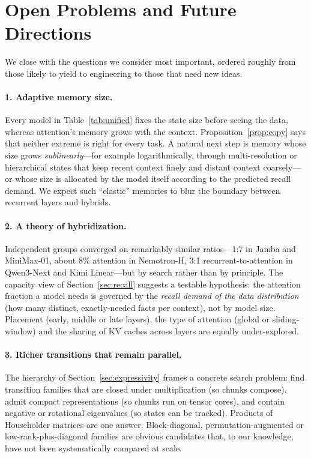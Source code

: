 \documentclass[a4paper]{article}
\theoremstyle{plain}
\theoremstyle{remark}
\begin{document}
\section{Open Problems and Future Directions}
\label{sec:future}
We close with the questions we consider most important, ordered roughly from those likely to yield to engineering to those that need new ideas.

\paragraph{1. Adaptive memory size.} Every model in Table~\ref{tab:unified} fixes the state size before seeing the data, whereas attention's memory grows with the context. Proposition~\ref{prop:copy} says that neither extreme is right for every task. A natural next step is memory whose size grows \emph{sublinearly}---for example logarithmically, through multi-resolution or hierarchical states that keep recent context finely and distant context coarsely---or whose size is allocated by the model itself according to the predicted recall demand. We expect such \textquotedblleft elastic\textquotedblright{} memories to blur the boundary between recurrent layers and hybrids.

\paragraph{2. A theory of hybridization.} Independent groups converged on remarkably similar ratios---1:7 in Jamba and MiniMax-01, about 8\% attention in Nemotron-H, 3:1 recurrent-to-attention in Qwen3-Next and Kimi Linear---but by search rather than by principle. The capacity view of Section~\ref{sec:recall} suggests a testable hypothesis: the attention fraction a model needs is governed by the \emph{recall demand of the data distribution} (how many distinct, exactly-needed facts per context), not by model size. Placement (early, middle or late layers), the type of attention (global or sliding-window) and the sharing of KV caches across layers are equally under-explored.

\paragraph{3. Richer transitions that remain parallel.} The hierarchy of Section~\ref{sec:expressivity} frames a concrete search problem: find transition families that are closed under multiplication (so chunks compose), admit compact representations (so chunks run on tensor cores), and contain negative or rotational eigenvalues (so states can be tracked). Products of Householder matrices are one answer. Block-diagonal, permutation-augmented or low-rank-plus-diagonal families are obvious candidates that, to our knowledge, have not been systematically compared at scale.
\end{document}
